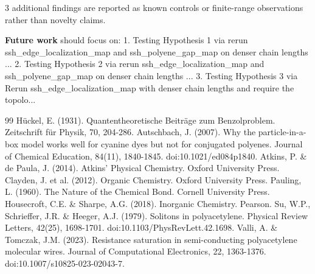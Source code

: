\documentclass[11pt,a4paper]{article}
\begin{document}
3 additional findings are reported as known controls or finite-range observations rather than novelty claims.

\textbf{Future work} should focus on:
1. Testing Hypothesis 1 via rerun ssh\_edge\_localization\_map and ssh\_polyene\_gap\_map on denser chain lengths ...
2. Testing Hypothesis 2 via rerun ssh\_edge\_localization\_map and ssh\_polyene\_gap\_map on denser chain lengths ...
3. Testing Hypothesis 3 via Rerun ssh\_edge\_localization\_map with denser chain lengths and require the topolo...


\begin{thebibliography}{99}
 Hückel, E. (1931). Quantentheoretische Beiträge zum Benzolproblem. Zeitschrift für Physik, 70, 204-286.
 Autschbach, J. (2007). Why the particle-in-a-box model works well for cyanine dyes but not for conjugated polyenes. Journal of Chemical Education, 84(11), 1840-1845. doi:10.1021/ed084p1840.
 Atkins, P. \& de Paula, J. (2014). Atkins' Physical Chemistry. Oxford University Press.
 Clayden, J. et al. (2012). Organic Chemistry. Oxford University Press.
 Pauling, L. (1960). The Nature of the Chemical Bond. Cornell University Press.
 Housecroft, C.E. \& Sharpe, A.G. (2018). Inorganic Chemistry. Pearson.
 Su, W.P., Schrieffer, J.R. \& Heeger, A.J. (1979). Solitons in polyacetylene. Physical Review Letters, 42(25), 1698-1701. doi:10.1103/PhysRevLett.42.1698.
 Valli, A. \& Tomczak, J.M. (2023). Resistance saturation in semi-conducting polyacetylene molecular wires. Journal of Computational Electronics, 22, 1363-1376. doi:10.1007/s10825-023-02043-7.
\end{thebibliography}
\end{document}
